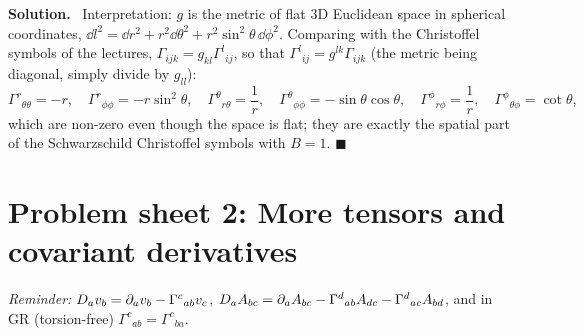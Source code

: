\documentclass[11pt,a4paper]{article}
\numberwithin{equation}{subsection}
\newenvironment{solution}{\par\noindent\textbf{\textcolor{excol!70!black}{Solution.}}\ }{\hfill$\blacksquare$\par\medskip}
\newcommand{\added}[1]{{\color{teal!60!black}#1}}
\begin{document}
\begin{solution}
\added{Interpretation:} $g$ is the metric of flat 3D Euclidean space in spherical coordinates, $\dd l^2=\dd r^2+r^2\dd\theta^2+r^2\sin^2\theta\,\dd\phi^2$. Comparing with the Christoffel symbols of the lectures, $\Gamma_{ijk}=g_{kl}\Gamma^l{}_{ij}$, so that $\Gamma^l{}_{ij}=g^{lk}\Gamma_{ijk}$ (the metric being diagonal, simply divide by $g_{ll}$):
\[
  \Gamma^r{}_{\theta\theta}=-r,\quad\Gamma^r{}_{\phi\phi}=-r\sin^2\theta,\quad\Gamma^\theta{}_{r\theta}=\frac1r,\quad\Gamma^\theta{}_{\phi\phi}=-\sin\theta\cos\theta,\quad\Gamma^\phi{}_{r\phi}=\frac1r,\quad\Gamma^\phi{}_{\theta\phi}=\cot\theta,
\]
which are non-zero even though the space is flat; they are exactly the spatial part of the Schwarzschild Christoffel symbols with $B=1$.
\end{solution}

\section{Problem sheet 2: More tensors and covariant derivatives}
\textit{Reminder:} $D_av_b=\partial_av_b-\Gamma^c{}_{ab}v_c$, $D_aA_{bc}=\partial_aA_{bc}-\Gamma^d{}_{ab}A_{dc}-\Gamma^d{}_{ac}A_{bd}$, and in GR (torsion-free) $\Gamma^c{}_{ab}=\Gamma^c{}_{ba}$.
\end{document}
